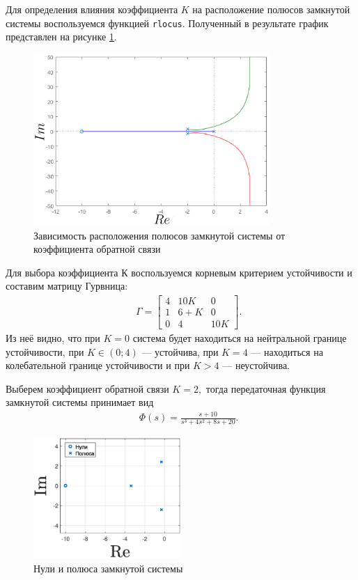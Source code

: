 \documentclass[fleqn, a4paper, 11pt, russian]{article}
\begin{document}
	Для определения влияния коэффициента $K$ на расположение полюсов замкнутой системы воспользуемся функцией \texttt{rlocus}. Полученный в результате график представлен на рисунке \ref{closedloc}.
	\begin{figure}[ht!]
		\centering
		\includegraphics[width = 0.8\textwidth]{Closed/rlocus}
		\caption{Зависимость расположения полюсов замкнутой системы от коэффициента обратной связи}
		\label{closedloc}
	\end{figure}
	
	Для выбора коэффициента К воспользуемся корневым критерием устойчивости и составим матрицу Гурвница:
	\begin{align}
		&&\Gamma = \begin{bmatrix}
			4	&	10K	&	0	\\
			1	&	6+K	&	0	\\
			0	&	4	&	10K
		\end{bmatrix}.
	\end{align}
	Из неё видно, что при $K = 0$ система будет находиться на нейтральной границе устойчивости, при $K \in (0;4)$ --- устойчива, при $K = 4$ --- находиться на колебательной границе устойчивости и при $K > 4$ --- неустойчива.
	
	Выберем коэффициент обратной связи $K = 2,$ тогда передаточная функция замкнутой системы принимает вид
	\begin{align}
		&&\Phi(s) = \frac{s + 10}{s^3 + 4s^2 + 8s + 20}.
	\end{align}
	
	\begin{figure}
		\centering
		\includegraphics[width = 0.5\textwidth]{Closed/pz}
		\caption{Нули и полюса замкнутой системы}
		\label{closedpz}
	\end{figure}
	
\end{document}
